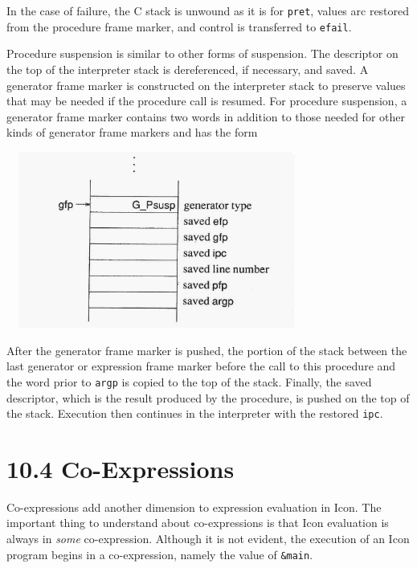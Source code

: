 In the case of failure, the C stack is unwound as it is for
\texttt{pret}, values arc restored from the procedure frame marker,
and control is transferred to \texttt{efail}.

Procedure suspension is similar to other forms of suspension. The
descriptor on the top of the interpreter stack is dereferenced, if
necessary, and saved. A generator frame marker is constructed on the
interpreter stack to preserve values that may be needed if the
procedure call is resumed. For procedure suspension, a generator frame
marker contains two words in addition to those needed for other kinds
of generator frame markers and has the form

\ \  \includegraphics[width=3.6098in,height=2.2835in]{ib-img/ib-img086.jpg} 

After the generator frame marker is pushed, the portion of the stack
between the last generator or expression frame marker before the call
to this procedure and the word prior to \texttt{argp} is copied to the
top of the stack.  Finally, the saved descriptor, which is the result
produced by the procedure, is pushed on the top of the stack.
Execution then continues in the interpreter with the restored
\texttt{ipc}.

\section[10.4 Co{}-Expressions]{10.4 Co-Expressions}

Co-expressions add another dimension to expression evaluation in
Icon. The important thing to understand about co-expressions is that
Icon evaluation is always in \textit{some }co-expression. Although it
is not evident, the execution of an Icon program begins in a
co-expression, namely the value of \texttt{\&main}.

